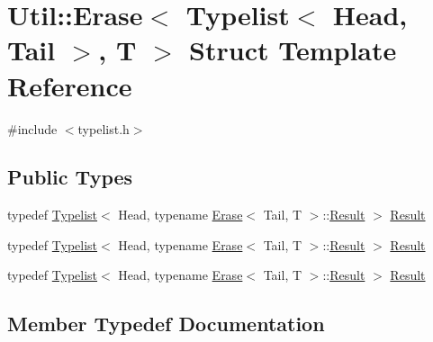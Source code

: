 \hypertarget{structUtil_1_1TL_1_1Erase_3_01Typelist_3_01Head_00_01Tail_01_4_00_01T_01_4}{}\section{Util\+:\+:Erase$<$ Typelist$<$ Head, Tail $>$, T $>$ Struct Template Reference}
\label{structUtil_1_1TL_1_1Erase_3_01Typelist_3_01Head_00_01Tail_01_4_00_01T_01_4}


{\ttfamily \#include $<$typelist.\+h$>$}

\subsection*{Public Types}
\begin{DoxyCompactItemize}
\item 
typedef \mbox{\hyperlink{structUtil_1_1Typelist}{Typelist}}$<$ Head, typename \mbox{\hyperlink{structUtil_1_1TL_1_1Erase}{Erase}}$<$ Tail, T $>$\+::\mbox{\hyperlink{structUtil_1_1TL_1_1Erase_3_01Typelist_3_01Head_00_01Tail_01_4_00_01T_01_4_a68b3e32a3703ec33f196f25e84e3841e}{Result}} $>$ \mbox{\hyperlink{structUtil_1_1TL_1_1Erase_3_01Typelist_3_01Head_00_01Tail_01_4_00_01T_01_4_a68b3e32a3703ec33f196f25e84e3841e}{Result}}
\item 
typedef \mbox{\hyperlink{structUtil_1_1Typelist}{Typelist}}$<$ Head, typename \mbox{\hyperlink{structUtil_1_1TL_1_1Erase}{Erase}}$<$ Tail, T $>$\+::\mbox{\hyperlink{structUtil_1_1TL_1_1Erase_3_01Typelist_3_01Head_00_01Tail_01_4_00_01T_01_4_a68b3e32a3703ec33f196f25e84e3841e}{Result}} $>$ \mbox{\hyperlink{structUtil_1_1TL_1_1Erase_3_01Typelist_3_01Head_00_01Tail_01_4_00_01T_01_4_a68b3e32a3703ec33f196f25e84e3841e}{Result}}
\item 
typedef \mbox{\hyperlink{structUtil_1_1Typelist}{Typelist}}$<$ Head, typename \mbox{\hyperlink{structUtil_1_1TL_1_1Erase}{Erase}}$<$ Tail, T $>$\+::\mbox{\hyperlink{structUtil_1_1TL_1_1Erase_3_01Typelist_3_01Head_00_01Tail_01_4_00_01T_01_4_a68b3e32a3703ec33f196f25e84e3841e}{Result}} $>$ \mbox{\hyperlink{structUtil_1_1TL_1_1Erase_3_01Typelist_3_01Head_00_01Tail_01_4_00_01T_01_4_a68b3e32a3703ec33f196f25e84e3841e}{Result}}
\end{DoxyCompactItemize}


\subsection{Member Typedef Documentation}
\mbox{\label{structUtil_1_1TL_1_1Erase_3_01Typelist_3_01Head_00_01Tail_01_4_00_01T_01_4_a68b3e32a3703ec33f196f25e84e3841e}} 
